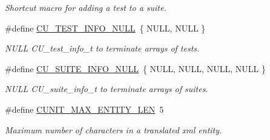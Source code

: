 \begin{DoxyCompactItemize}
\begin{DoxyCompactList}\small\item\em Shortcut macro for adding a test to a suite. \end{DoxyCompactList}\item 
\#define \hyperlink{group__Framework_gab9f0524d334d5fb412adb49ce8227600}{C\-U\-\_\-\-T\-E\-S\-T\-\_\-\-I\-N\-F\-O\-\_\-\-N\-U\-L\-L}~\{ N\-U\-L\-L, N\-U\-L\-L \}
\begin{DoxyCompactList}\small\item\em N\-U\-L\-L C\-U\-\_\-test\-\_\-info\-\_\-t to terminate arrays of tests. \end{DoxyCompactList}\item 
\#define \hyperlink{group__Framework_ga6dbb9f7e589b77ea1bbf2d29fae65f1a}{C\-U\-\_\-\-S\-U\-I\-T\-E\-\_\-\-I\-N\-F\-O\-\_\-\-N\-U\-L\-L}~\{ N\-U\-L\-L, N\-U\-L\-L, N\-U\-L\-L, N\-U\-L\-L \}
\begin{DoxyCompactList}\small\item\em N\-U\-L\-L C\-U\-\_\-suite\-\_\-info\-\_\-t to terminate arrays of suites. \end{DoxyCompactList}\item 
\#define \hyperlink{group__Framework_ga089820634e54b8284d03d85e8b8e41a7}{C\-U\-N\-I\-T\-\_\-\-M\-A\-X\-\_\-\-E\-N\-T\-I\-T\-Y\-\_\-\-L\-E\-N}~5
\begin{DoxyCompactList}\small\item\em Maximum number of characters in a translated xml entity. \end{DoxyCompactList}\end{DoxyCompactItemize}
